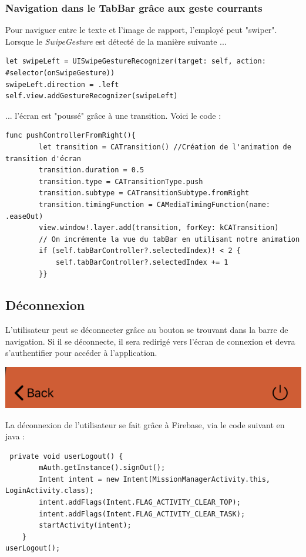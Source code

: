 \documentclass{article}
\begin{document}
 
 \subsubsection{Navigation dans le TabBar grâce aux geste courrants}
Pour naviguer entre le texte et l'image de rapport, l'employé peut "swiper".
Lorsque le \textit{SwipeGesture} est détecté de la manière suivante ...

\begin{verbatim}
let swipeLeft = UISwipeGestureRecognizer(target: self, action: #selector(onSwipeGesture))
swipeLeft.direction = .left
self.view.addGestureRecognizer(swipeLeft)
\end{verbatim}

... l'écran est "poussé" grâce à une transition. Voici le code : 

\begin{verbatim}
func pushControllerFromRight(){
        let transition = CATransition() //Création de l'animation de transition d'écran
        transition.duration = 0.5
        transition.type = CATransitionType.push
        transition.subtype = CATransitionSubtype.fromRight
        transition.timingFunction = CAMediaTimingFunction(name: .easeOut)
        view.window!.layer.add(transition, forKey: kCATransition)
        // On incrémente la vue du tabBar en utilisant notre animation
        if (self.tabBarController?.selectedIndex)! < 2 {
            self.tabBarController?.selectedIndex += 1
        }}
\end{verbatim}

\newpage

\subsection{Déconnexion}

L'utilisateur peut se déconnecter grâce au bouton se trouvant dans la barre de navigation. Si il se déconnecte, il sera redirigé vers l'écran de connexion et devra s'authentifier pour accéder à l'application.
\begin{center}
  \includegraphics[scale=0.5]{logoutIOS.png}
\end{center}

La déconnexion de l'utilisateur se fait grâce à Firebase, via le code suivant en java  : \begin{verbatim}
 private void userLogout() {
        mAuth.getInstance().signOut();
        Intent intent = new Intent(MissionManagerActivity.this, LoginActivity.class);
        intent.addFlags(Intent.FLAG_ACTIVITY_CLEAR_TOP);
        intent.addFlags(Intent.FLAG_ACTIVITY_CLEAR_TASK);
        startActivity(intent);
    }
userLogout();
\end{verbatim}
\end{document}
